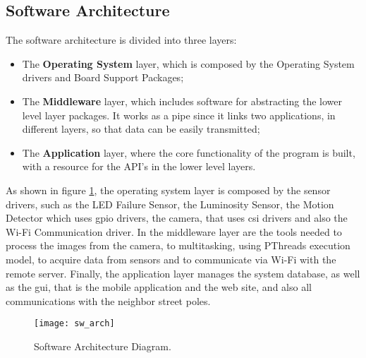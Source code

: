 \subsection{Software Architecture}
The software architecture is divided into three layers:
\begin{itemize}
        \item The \textbf{Operating System} layer, which is composed by the Operating System drivers and Board Support Packages;
        \item The \textbf{Middleware} layer, which includes software for abstracting the lower level layer packages. It works as a pipe since it links two applications, in different layers, so that data can be easily transmitted;
        \item The \textbf{Application} layer, where the core functionality of the program is built, with a resource for the API's in the lower level layers.
\end{itemize}
As shown in figure \ref{fig:sw_arch}, the operating system layer is composed by the sensor drivers, such as the LED Failure Sensor, the Luminosity Sensor, the Motion Detector which uses \ac{gpio} drivers, the camera, that uses \ac{csi} drivers and also the Wi-Fi Communication driver. In the middleware layer are the tools needed to process the images from the camera, to multitasking, using PThreads execution model, to acquire data from sensors and to communicate via Wi-Fi with the remote server. Finally, the application layer manages the system database, as well as the \ac{gui}, that is the mobile application and the web site, and also all communications with the neighbor street poles.
\begin{figure}[ht]
        \centering
        \texttt{[image: sw\_arch]}
        \caption{Software Architecture Diagram.}
        \label{fig:sw_arch}
\end{figure}